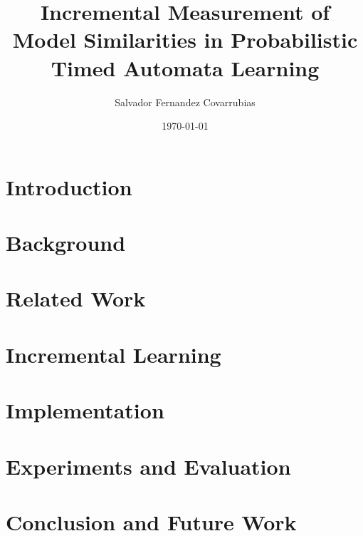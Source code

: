 \documentclass[
fancyheadings, %
%
%
]{stsreprt}
\author{Salvador Fernandez Covarrubias}
\title{Incremental Measurement of Model Similarities in Probabilistic Timed Automata Learning}
\date{\today}
\theoremstyle{definition}
\theoremstyle{remark}
\begin{document}
	\frontmatter
	\maketitle
	
	\tableofcontents
	\listoffigures{}
	\listofalgorithms

	\mainmatter
	
	\addchap*{}
	
	
	\chapter{Introduction}
	\label{chap:introduction}
	
	
	\chapter{Background}
	\label{chap:background}
	
	
	\chapter{Related Work}
	\label{chap:related_work}
	
	
	\chapter{Incremental Learning}	
	\label{chap:incremental_Learning}
	 
	
	\chapter{Implementation}
	\label{chap:implementation}
	 
	
	\chapter{Experiments and Evaluation}	
	\label{chap:experimentation}
	 
	
	\chapter{Conclusion and Future Work}
	\label{chap:futureWork}
	
	
\end{document}
